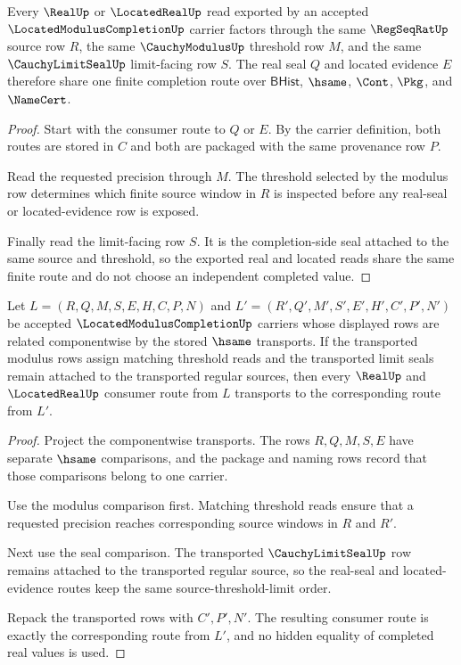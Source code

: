 \begin{theorem}
\label{thm:located-modulus-completion-regular-seal}
Every $\RealUp$ or $\LocatedRealUp$ read exported by an accepted $\LocatedModulusCompletionUp$ carrier factors through the same $\RegSeqRatUp$ source row $R$, the same $\CauchyModulusUp$ threshold row $M$, and the same $\CauchyLimitSealUp$ limit-facing row $S$. The real seal $Q$ and located evidence $E$ therefore share one finite completion route over $\mathsf{BHist}$, $\hsame$, $\Cont$, $\Pkg$, and $\NameCert$.
\end{theorem}
\begin{proof}
Start with the consumer route to $Q$ or $E$. By the carrier definition, both routes are stored in $C$ and both are packaged with the same provenance row $P$.

Read the requested precision through $M$. The threshold selected by the modulus row determines which finite source window in $R$ is inspected before any real-seal or located-evidence row is exposed.

Finally read the limit-facing row $S$. It is the completion-side seal attached to the same source and threshold, so the exported real and located reads share the same finite route and do not choose an independent completed value.
\end{proof}

\begin{theorem}
\label{thm:located-modulus-completion-classifier-stability}
Let $L=(R,Q,M,S,E,H,C,P,N)$ and $L'=(R',Q',M',S',E',H',C',P',N')$ be accepted $\LocatedModulusCompletionUp$ carriers whose displayed rows are related componentwise by the stored $\hsame$ transports. If the transported modulus rows assign matching threshold reads and the transported limit seals remain attached to the transported regular sources, then every $\RealUp$ and $\LocatedRealUp$ consumer route from $L$ transports to the corresponding route from $L'$.
\end{theorem}
\begin{proof}
Project the componentwise transports. The rows $R,Q,M,S,E$ have separate $\hsame$ comparisons, and the package and naming rows record that those comparisons belong to one carrier.

Use the modulus comparison first. Matching threshold reads ensure that a requested precision reaches corresponding source windows in $R$ and $R'$.

Next use the seal comparison. The transported $\CauchyLimitSealUp$ row remains attached to the transported regular source, so the real-seal and located-evidence routes keep the same source-threshold-limit order.

Repack the transported rows with $C',P',N'$. The resulting consumer route is exactly the corresponding route from $L'$, and no hidden equality of completed real values is used.
\end{proof}


